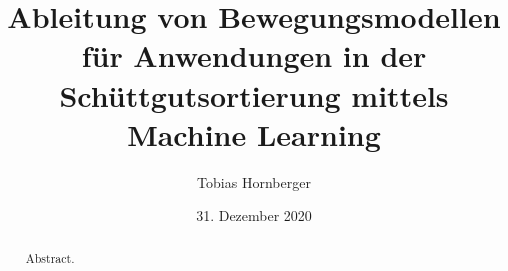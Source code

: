 \documentclass[english,algorithms,reviews,examples]{isasthesis}
\title{Ableitung von Bewegungsmodellen für Anwendungen in der Schüttgutsortierung mittels Machine Learning}
\author{Tobias Hornberger}
\date{31. Dezember 2020}
\begin{document}
    \maketitle

    \begin{abstract}
        Abstract.
    \end{abstract}

    \maketoc


    
    




    \nocite{*}

    \printbibliography[heading=bibintoc]
\end{document}
